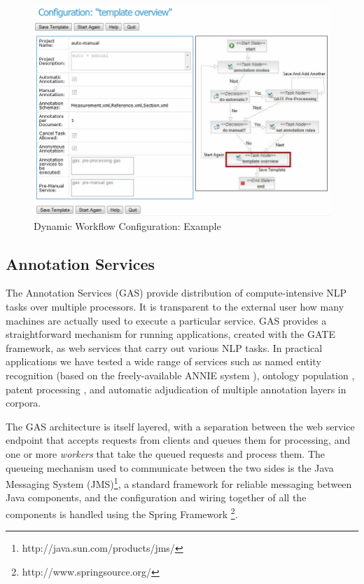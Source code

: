\begin{figure}[htb]
\begin{center}
\includegraphics[scale=0.7]{treamware-workflow-example.png}
\caption{Dynamic Workflow Configuration: Example} \label{fig:workflowExample}
\end{center}
\end{figure}

\subsection{Annotation Services}

The Annotation Services (GAS) provide distribution of compute-intensive NLP tasks over multiple processors. It is transparent to the external user how many machines are actually used to execute a particular service. GAS provides a straightforward mechanism for running applications, created with the GATE framework, as web services that carry out various NLP tasks. In practical applications we have tested a wide range of services such as named entity recognition (based on the freely-available ANNIE system \cite{Cun02b}), ontology population \cite{Maynard09b}, patent processing \cite{Agatonovic08}, and automatic adjudication of multiple annotation layers in corpora. 

The GAS architecture is itself layered, with a separation between the web service endpoint that accepts requests from clients and queues them for processing, and one or more \emph{workers} that take the queued requests and process them.  The queueing mechanism used to communicate between the two sides is the Java Messaging System (JMS)\footnote{http://java.sun.com/products/jms/}, a standard framework for reliable messaging between Java components, and the configuration and wiring together of all the components is handled using the Spring Framework \footnote{http://www.springsource.org/}.

